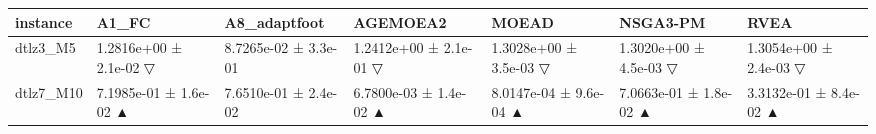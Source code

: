 \begin{tabular}{lllllll}
\toprule
instance & A1\_FC & A8\_adaptfoot & AGEMOEA2 & MOEAD & NSGA3-PM & RVEA \\
\midrule
dtlz3\_M5 & 1.2816e+00 ± 2.1e-02 ▽ & 8.7265e-02 ± 3.3e-01 & 1.2412e+00 ± 2.1e-01 ▽ & 1.3028e+00 ± 3.5e-03 ▽ & 1.3020e+00 ± 4.5e-03 ▽ & 1.3054e+00 ± 2.4e-03 ▽ \\
dtlz7\_M10 & 7.1985e-01 ± 1.6e-02 ▲ & 7.6510e-01 ± 2.4e-02 & 6.7800e-03 ± 1.4e-02 ▲ & 8.0147e-04 ± 9.6e-04 ▲ & 7.0663e-01 ± 1.8e-02 ▲ & 3.3132e-01 ± 8.4e-02 ▲ \\
\bottomrule
\end{tabular}
